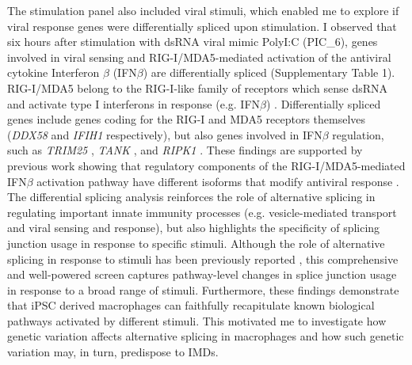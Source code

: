 The stimulation panel also included viral stimuli, which enabled me to explore if viral response genes were differentially spliced upon stimulation. I observed that six hours after stimulation with dsRNA viral mimic PolyI:C (PIC\_6), genes involved in viral sensing and RIG-I/MDA5-mediated activation of the antiviral cytokine Interferon $\beta$ (IFN$\beta$) are differentially spliced (Supplementary Table 1). RIG-I/MDA5 belong to the RIG-I-like family of receptors which sense dsRNA and activate type I interferons in response (e.g. IFN$\beta$) \cite{Yoneyama2005-ba,Kato2005-ie}. Differentially spliced genes include genes coding for the RIG-I and MDA5 receptors themselves (\textit{DDX58} and \textit{IFIH1} respectively), but also genes involved in IFN$\beta$ regulation, such as \textit{TRIM25} \cite{Castanier2012-io}, \textit{TANK} \cite{Al_Hamrashdi2022-pr}, and \textit{RIPK1} \cite{Saleh2017-fv}. These findings are supported by previous work showing  that regulatory components of the RIG-I/MDA5-mediated IFN$\beta$ activation pathway have different isoforms that modify antiviral response \cite{Gack2009-nw,Liao2021-aj,Lad2008-jd}. \\

The differential splicing analysis reinforces the role of alternative splicing in regulating important innate immunity processes (e.g. vesicle-mediated transport and viral sensing and response), but also highlights the specificity of splicing junction usage in response to specific stimuli. Although the role of alternative splicing in response to stimuli has been previously reported \cite{Wagner2021-fl}, this comprehensive and well-powered screen captures pathway-level changes in splice junction usage in response to a broad range of stimuli. Furthermore, these findings demonstrate that iPSC derived macrophages can faithfully recapitulate known biological pathways activated by different stimuli. This motivated me to investigate how genetic variation affects alternative splicing in macrophages and how such genetic variation may, in turn, predispose to IMDs.\\

